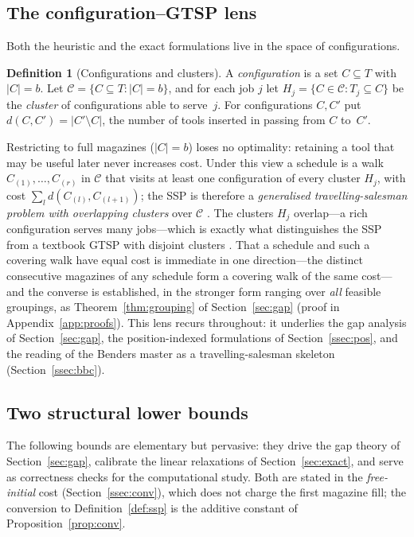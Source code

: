 \documentclass[11pt,a4paper]{article}
\theoremstyle{plain}
\theoremstyle{definition}
\newtheorem{definition}{Definition}
\theoremstyle{remark}
\newcommand{\confs}{\mathcal{C}}
\newcommand{\rset}[1]{\{#1\}}
\begin{document}
\subsection{The configuration--GTSP lens}\label{ssec:gtsp}
Both the heuristic and the exact formulations live in the space of configurations.
\begin{definition}[Configurations and clusters]\label{def:config}
A \emph{configuration} is a set $C\subseteq T$ with $\lvert C\rvert=b$. Let
$\confs=\rset{C\subseteq T:\lvert C\rvert=b}$, and for each job $j$ let $H_j=
\rset{C\in\confs:T_j\subseteq C}$ be the \emph{cluster} of configurations able to
serve~$j$. For configurations $C,C'$ put $d(C,C')=\lvert C'\setminus C\rvert$, the
number of tools inserted in passing from $C$ to~$C'$.
\end{definition}
Restricting to full magazines ($\lvert C\rvert=b$) loses no optimality: retaining a
tool that may be useful later never increases cost. Under this view a schedule is a
walk $C_{(1)},\dots,C_{(r)}$ in $\confs$ that visits at least one configuration of
every cluster $H_j$, with cost $\sum_l d(C_{(l)},C_{(l+1)})$; the SSP is therefore a
\emph{generalised travelling-salesman problem with overlapping clusters} over
$\confs$ \citep{Colares2026Exact}. The clusters $H_j$ overlap---a rich configuration
serves many jobs---which is exactly what distinguishes the SSP from a textbook GTSP
with disjoint clusters \citep{Noon1993,Fischetti1997,Pop2024}. That a schedule and such a covering walk have equal cost is immediate in one
direction---the distinct consecutive magazines of any schedule form a covering walk
of the same cost---and the converse is established, in the stronger form ranging
over \emph{all} feasible groupings, as Theorem~\ref{thm:grouping} of
Section~\ref{sec:gap} (proof in Appendix~\ref{app:proofs}). This lens recurs
throughout: it underlies the gap analysis of Section~\ref{sec:gap}, the
position-indexed formulations of Section~\ref{ssec:pos}, and the reading of the
Benders master as a travelling-salesman skeleton (Section~\ref{ssec:bbc}).

\subsection{Two structural lower bounds}\label{ssec:lb}
The following bounds are elementary but pervasive: they drive the gap theory of
Section~\ref{sec:gap}, calibrate the linear relaxations of
Section~\ref{sec:exact}, and serve as correctness checks for the computational
study. Both are stated in the \emph{free-initial} cost (Section~\ref{ssec:conv}),
which does not charge the first magazine fill; the conversion to
Definition~\ref{def:ssp} is the additive constant of Proposition~\ref{prop:conv}.
\end{document}
